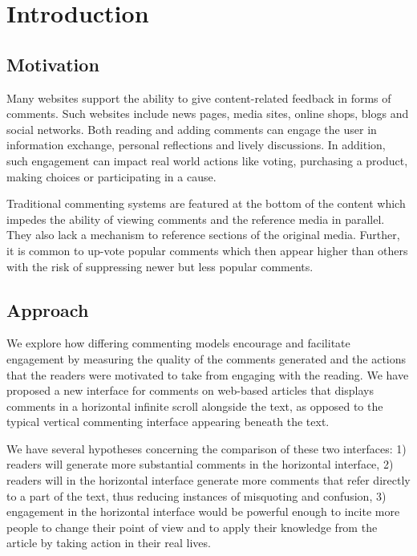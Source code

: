 \section{Introduction}

\subsection{Motivation}

Many websites support the ability to give content-related feedback in forms of comments. Such websites include news pages, media sites, online shops, blogs and social networks. Both reading and adding comments can engage
the user in information exchange, personal reflections and lively discussions. In addition, such engagement can impact real world actions like voting, purchasing a product, making choices or participating in a cause. 

Traditional commenting systems are featured at the bottom of the content which impedes the ability of viewing comments and the reference media in parallel. They also lack a mechanism to reference sections of the original media. Further, it is common to up-vote popular comments which then appear higher than others with the risk of suppressing newer but less popular comments.

\subsection{Approach}

We explore how differing commenting models encourage and facilitate engagement by measuring the quality of the comments generated and the actions that the readers were motivated to take from engaging with the reading. We have proposed a new interface for comments on web-based articles that displays comments in a horizontal infinite scroll alongside the text, as opposed to the typical vertical commenting interface appearing beneath the text.
 
We have several hypotheses concerning the comparison of these two interfaces: 1) readers will generate more substantial comments in the horizontal interface, 2) readers will in the horizontal interface generate more comments that refer directly to a part of the text, thus reducing instances of misquoting and confusion, 3) engagement in the horizontal interface would be powerful enough to incite more people to change their point of view and to apply their knowledge from the article by taking action in their real lives.
 
